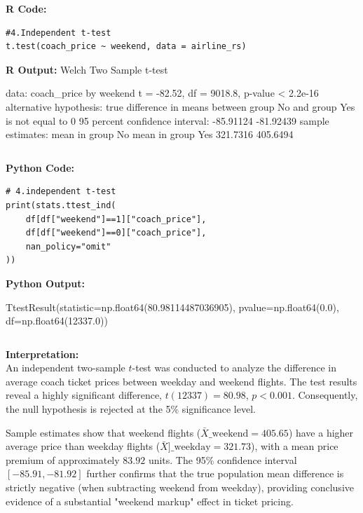\documentclass[11pt,a4paper]{article}
\begin{document}
\noindent \textbf{R Code:}
\begin{codebox}
\begin{lstlisting}[style=Rstyle]
#4.Independent t-test
t.test(coach_price ~ weekend, data = airline_rs)
\end{lstlisting}
\end{codebox}
\vspace{0.5em}
\noindent \textbf{R Output:}
Welch Two Sample t-test

data:  coach\_price by weekend
t = -82.52, df = 9018.8, p-value < 2.2e-16
alternative hypothesis: true difference in means between group No and group Yes is not equal to 0
95 percent confidence interval:
 -85.91124 -81.92439
sample estimates:
 mean in group No mean in group Yes 
         321.7316          405.6494 
\begin{verbatim}
\end{verbatim}
\vspace{0.5em}
\noindent \textbf{Python Code:}
\begin{codebox}
\begin{lstlisting}[style=Pythonstyle]
# 4.independent t-test 
print(stats.ttest_ind(
    df[df["weekend"]==1]["coach_price"],
    df[df["weekend"]==0]["coach_price"],
    nan_policy="omit"
))
\end{lstlisting}
\end{codebox}
\vspace{0.5em}

\noindent \textbf{Python Output:}

TtestResult(statistic=np.float64(80.98114487036905), pvalue=np.float64(0.0), df=np.float64(12337.0))
\begin{verbatim}
\end{verbatim}
\vspace{0.5em}
\noindent \textbf{Interpretation:} \\
An independent two-sample $t$-test was conducted to analyze the difference in average 
coach ticket prices between weekday and weekend flights. The test results reveal a 
highly significant difference, $t(12337) = 80.98$, $p < 0.001$. Consequently, the null 
hypothesis is rejected at the 5\% significance level.

Sample estimates show that weekend flights ($\bar{X}\_{\text{weekend}} = 405.65$) have a 
higher average price than weekday flights ($\bar{X}]\_{\text{weekday}} = 321.73$), with a 
mean price premium of approximately $83.92$ units. The 95\% confidence interval 
$[-85.91, -81.92]$ further confirms that the true population mean difference is strictly 
negative (when subtracting weekend from weekday), providing conclusive evidence of a 
substantial "weekend markup" effect in ticket pricing.
\vspace{2.5em}
\end{document}
